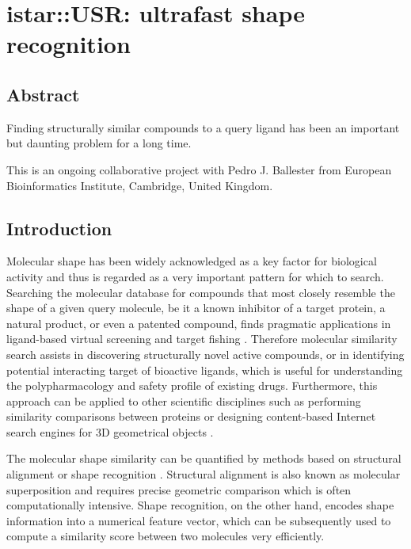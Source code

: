 \chapter{istar::USR: ultrafast shape recognition}

\section{Abstract}

Finding structurally similar compounds to a query ligand has been an important but daunting problem for a long time.

This is an ongoing collaborative project with Pedro J. Ballester from European Bioinformatics Institute, Cambridge, United Kingdom.

\section{Introduction}

Molecular shape has been widely acknowledged as a key factor for biological activity and thus is regarded as a very important pattern for which to search. Searching the molecular database for compounds that most closely resemble the shape of a given query molecule, be it a known inhibitor of a target protein, a natural product, or even a patented compound, finds pragmatic applications in ligand-based virtual screening \citep{1332,1380} and target fishing \citep{1407,1408,1402}. Therefore molecular similarity search assists in discovering structurally novel active compounds, or in identifying potential interacting target of bioactive ligands, which is useful for understanding the polypharmacology and safety profile of existing drugs. Furthermore, this approach can be applied to other scientific disciplines such as performing similarity comparisons between proteins or designing content-based Internet search engines for 3D geometrical objects \citep{1280}.

The molecular shape similarity can be quantified by methods based on structural alignment \citep{1440,887,1439} or shape recognition \citep{1379,1338,1331}. Structural alignment is also known as molecular superposition and requires precise geometric comparison which is often computationally intensive. Shape recognition, on the other hand, encodes shape information into a numerical feature vector, which can be subsequently used to compute a similarity score between two molecules very efficiently.%

